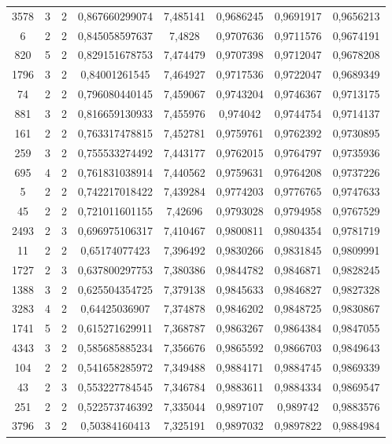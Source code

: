 \begin{longtable}{|c|c|c|c|c|c|c|c|}
3578 & 3 & 2 & 0,867660299074 & 7,485141 & 0,9686245 & 0,9691917 & 0,9656213 \\
6 & 2 & 2 & 0,845058597637 & 7,4828 & 0,9707636 & 0,9711576 & 0,9674191 \\
820 & 5 & 2 & 0,829151678753 & 7,474479 & 0,9707398 & 0,9712047 & 0,9678208 \\
1796 & 3 & 2 & 0,84001261545 & 7,464927 & 0,9717536 & 0,9722047 & 0,9689349 \\
74 & 2 & 2 & 0,796080440145 & 7,459067 & 0,9743204 & 0,9746367 & 0,9713175 \\
881 & 3 & 2 & 0,816659130933 & 7,455976 & 0,974042 & 0,9744754 & 0,9714137 \\
161 & 2 & 2 & 0,763317478815 & 7,452781 & 0,9759761 & 0,9762392 & 0,9730895 \\
259 & 3 & 2 & 0,755533274492 & 7,443177 & 0,9762015 & 0,9764797 & 0,9735936 \\
695 & 4 & 2 & 0,761831038914 & 7,440562 & 0,9759631 & 0,9764208 & 0,9737226 \\
5 & 2 & 2 & 0,742217018422 & 7,439284 & 0,9774203 & 0,9776765 & 0,9747633 \\
45 & 2 & 2 & 0,721011601155 & 7,42696 & 0,9793028 & 0,9794958 & 0,9767529 \\
2493 & 2 & 3 & 0,696975106317 & 7,410467 & 0,9800811 & 0,9804354 & 0,9781719 \\
11 & 2 & 2 & 0,65174077423 & 7,396492 & 0,9830266 & 0,9831845 & 0,9809991 \\
1727 & 2 & 3 & 0,637800297753 & 7,380386 & 0,9844782 & 0,9846871 & 0,9828245 \\
1388 & 3 & 2 & 0,625504354725 & 7,379138 & 0,9845633 & 0,9846827 & 0,9827328 \\
3283 & 4 & 2 & 0,64425036907 & 7,374878 & 0,9846202 & 0,9848725 & 0,9830867 \\
1741 & 5 & 2 & 0,615271629911 & 7,368787 & 0,9863267 & 0,9864384 & 0,9847055 \\
4343 & 3 & 2 & 0,585685885234 & 7,356676 & 0,9865592 & 0,9866703 & 0,9849643 \\
104 & 2 & 2 & 0,541658285972 & 7,349488 & 0,9884171 & 0,9884745 & 0,9869339 \\
43 & 2 & 3 & 0,553227784545 & 7,346784 & 0,9883611 & 0,9884334 & 0,9869547 \\
251 & 2 & 2 & 0,522573746392 & 7,335044 & 0,9897107 & 0,989742 & 0,9883576 \\
3796 & 3 & 2 & 0,50384160413 & 7,325191 & 0,9897032 & 0,9897822 & 0,9884984 \\

\end{longtable}
